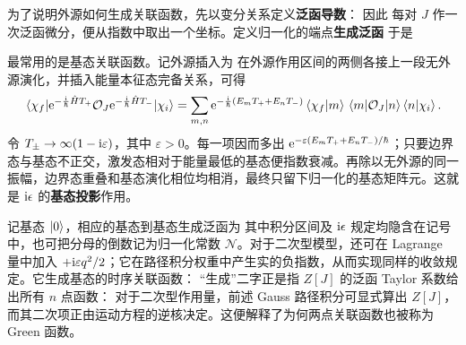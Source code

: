为了说明外源如何生成关联函数，先以变分关系定义\textbf{泛函导数}：
因此
每对 $J$ 作一次泛函微分，便从指数中取出一个坐标。定义归一化的端点\textbf{生成泛函}
于是

最常用的是基态关联函数。记外源插入为
在外源作用区间的两侧各接上一段无外源演化，并插入能量本征态完备关系，可得
\[
    \mel{\chi_f}{\e^{-\frac{\i}{\hbar}\hat H T_+}
    \mathcal O_J
    \e^{-\frac{\i}{\hbar}\hat H T_-}}{\chi_i}=\sum_{m,n}
    \e^{-\frac{\i}{\hbar}(E_mT_++E_nT_-)}
    \ip{\chi_f}{m}\mel{m}{\mathcal O_J}{n}\ip{n}{\chi_i}.
\]
令 $T_\pm\to\infty(1-\mathrm{i}\varepsilon)$，其中 $\varepsilon>0$。每一项因而多出 $\mathrm{e}^{-\varepsilon(E_mT_++E_nT_-)/\hbar}$；只要边界态与基态不正交，激发态相对于能量最低的基态便指数衰减。再除以无外源的同一振幅，边界态重叠和基态演化相位均相消，最终只留下归一化的基态矩阵元。这就是 $\mathrm{i}\epsilon$ 的\textbf{基态投影}作用。

记基态 $\ket 0$，相应的基态到基态生成泛函为
其中积分区间及 $\mathrm{i}\epsilon$ 规定均隐含在记号中，也可把分母的倒数记为归一化常数 $\mathcal N$。对于二次型模型，还可在 Lagrange 量中加入 $+\mathrm{i}\varepsilon q^2/2$；它在路径积分权重中产生实的负指数，从而实现同样的收敛规定。它生成基态的时序关联函数：
“生成”二字正是指 $Z[J]$ 的泛函 Taylor 系数给出所有 $n$ 点函数：
对于二次型作用量，前述 Gauss 路径积分可显式算出 $Z[J]$，而其二次项正由运动方程的逆核决定。这便解释了为何两点关联函数也被称为 Green 函数。


